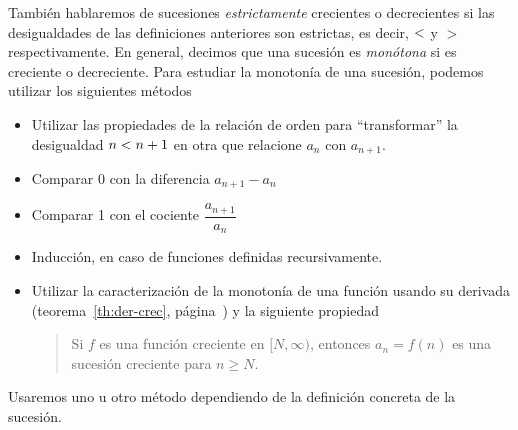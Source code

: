 También hablaremos de sucesiones \emph{estrictamente} crecientes o decrecientes si las desigualdades de las definiciones anteriores son estrictas, es decir, $<$ y $>$ respectivamente.
En general, decimos que una sucesión es \emph{monótona} si es creciente o decreciente.
Para estudiar la monotonía de una sucesión, podemos utilizar los siguientes métodos
\begin{itemize}
\item
Utilizar las propiedades de la relación de orden para ``transformar'' la desigualdad $n< n+1$ en otra que relacione $a_n$ con $a_{n+1}$.
\item
Comparar 0 con la diferencia $a_{n+1}-a_n$

\item
Comparar 1 con el cociente $\dfrac{a_{n+1}}{a_n}$

\item
Inducción, en caso de funciones definidas recursivamente.

\item
Utilizar la caracterización de la monotonía de una función usando su derivada (teorema~\ref{th:der-crec}, página~\pageref{th:der-crec}) y la siguiente propiedad
\begin{quote}
Si $f$ es una función creciente en $[N,\infty)$, entonces  $a_n=f(n)$ es una sucesión creciente para $n\ge N$.
\end{quote}
\end{itemize}
Usaremos uno u otro método dependiendo de la definición concreta de la sucesión.

